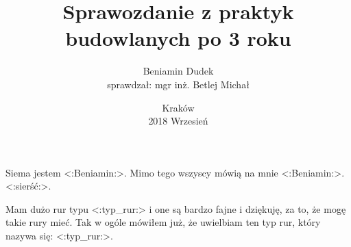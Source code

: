 \documentclass[a4paper,11pt,fleqn]{mwart}
\title{Sprawozdanie z praktyk budowlanych po 3 roku}
\date{Kraków\\ 2018 Wrzesień}
\author{Beniamin Dudek \\ sprawdzał: mgr inż. Betlej Michał}
\begin{document}
	\maketitle
	Siema jestem <:Beniamin:>. Mimo tego wszyscy mówią na mnie <:Beniamin:>.
	<:sierść:>.

	Mam dużo rur typu <:typ_rur:> i one są bardzo fajne i dziękuję, za to, że mogę takie rury mieć.
	Tak w ogóle mówiłem już, że uwielbiam ten typ rur, który nazywa się: <:typ_rur:>.
\end{document}

